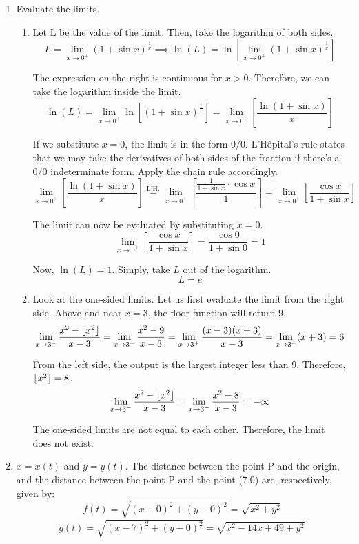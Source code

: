 \documentclass[a4paper, 12pt]{article}
\DeclarePairedDelimiter\floor{\lfloor}{\rfloor}
\begin{document}
\begin{enumerate}[leftmargin=*,label=\textbf{\arabic*.}]
\newpage

\item Evaluate the limits.
\begin{enumerate}[leftmargin=*,label=\textbf{\alph*.}]
\item Let L be the value of the limit. Then, take the logarithm of both sides.
\[L = \lim_{x\to 0^+} (1+\sin x)^{\frac{1}{x}}\implies \ln(L)=\ln\left[\lim_{x\to 0^+} (1+\sin x)^{\frac{1}{x}}\right]\]

The expression on the right is continuous for $x>0$. Therefore, we can take the logarithm inside the limit.
\[\ln(L)=\lim_{x\to 0^+}\ln\left[(1+\sin x)^{\frac{1}{x}}\right]=\lim_{x\to 0^+}\left[\frac{\ln(1+\sin x)}{x}\right]\]

If we substitute $x=0$, the limit is in the form $0/0$. L'Hôpital's rule states that we may take the derivatives of both sides of the fraction if there's a $0/0$ indeterminate form. Apply the chain rule accordingly.
\[\lim_{x\to 0^+} \left[\frac{\ln(1+\sin x)}{x}\right]\overset{\text{L'H.}}{=}\lim_{x\to 0^+} \left[\frac{\frac{1}{1+\sin x}\cdot\cos x}{1}\right]=\lim_{x\to 0^+}\left[\frac{\cos x}{1+\sin x}\right] \]

The limit can now be evaluated by substituting $x=0$.
\[\lim_{x\to 0^+} \left[\frac{\cos x}{1+\sin x}\right] = \frac{\cos 0}{1 + \sin 0 } =1\]

Now, $\ln(L) = 1$. Simply, take $L$ out of the logarithm.
\[\boxed{L =  e}\]

\item Look at the one-sided limits. Let us first evaluate the limit from the right side. Above and near $x=3$, the floor function will return $9$.
\[ \lim_{x\to 3^+} \frac{x^2-\floor{x^2}}{x-3} = \lim_{x\to 3^+}\frac{x^2-9}{x-3} = \lim_{x\to 3^+}\frac{(x-3)(x+3)}{x-3} = \lim_{x\to 3^+}(x+3)= 6\]

From the left side, the output is the largest integer less than $9$. Therefore, $\floor{x^2} = 8$.
\[ \lim_{x\to 3^-} \frac{x^2-\floor{x^2}}{x-3} = \lim_{x\to 3^-}\frac{x^2-8}{x-3} = -\infty\]

The one-sided limits are not equal to each other. Therefore, the limit $\boxed{\text{does not exist}}$.
\end{enumerate}

\item $x=x(t)$ and $y=y(t)$. The distance between the point P and the origin, and the distance between the point P and the point (7,0) are, respectively, given by:
\[f(t) = \sqrt{(x-0)^2 + (y-0)^2} = \sqrt{x^2+y^2}\]
\[g(t) = \sqrt{(x-7)^2 + (y-0)^2} = \sqrt{x^2-14x +49+y^2}\]


\end{enumerate}
\end{document}
